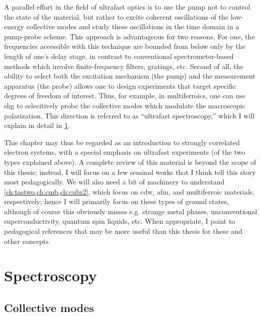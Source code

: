 A parallel effort in the field of ultrafast optics is to use the pump not to control the state of the material, but rather to excite coherent oscillations of the low-energy collective modes and study these oscillations in the time domain in a pump-probe scheme.
This approach is advantageous for two reasons.
For one, the frequencies accessible with this technique are bounded from below only by the length of one's delay stage, in contrast to conventional spectrometer-based methods which involve finite-frequency filters, gratings, etc.
Second of all, the ability to select both the excitation mechanism (the pump) and the measurement apparatus (the probe) allows one to design experiments that target specific degrees of freedom of interest.
Thus, for example, in multiferroics, one can use \gls{shg} to selecitively probe the collective modes which modulate the macroscopic polarization.
This direction is referred to as ``ultrafast spectroscopy,'' which I will explain in detail in \cref{sec:ultrafastspectroscopy}.

This chapter may thus be regarded as an introduction to strongly correlated electron systems, with a special emphasis on ultrafast experiments (of the two types explained above).
A complete review of this material is beyond the scope of this thesis; instead, I will focus on a few seminal works that I think tell this story most pedagogically.
We will also need a bit of machinery to understand \cref{ch:tastwo,ch:cmb,ch:cubr2}, which focus on \gls{cdw}, \gls{afm}, and multiferroic materials, respectively; hence I will primarily focus on these types of ground states, although of course this obviously misses e.g. strange metal phases, unconventional superconductivity, quantum spin liquids, etc.
When appropriate, I point to pedagogical references that may be more useful than this thesis for these and other concepts.

\section{Spectroscopy}\label{sec:ultrafastspectroscopy}

\subsection{Collective modes}

